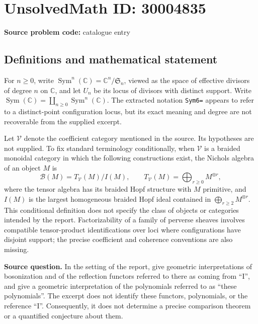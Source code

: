 \documentclass[11pt]{article}
\newcommand{\C}{\mathbb{C}}
\begin{document}
\section*{UnsolvedMath ID: 30004835}
\textbf{Source problem code:} catalogue entry
\subsection{Definitions and mathematical statement}
For \(n\geq 0\), write \(\operatorname{Sym}^{n}(\C)=\C^{n}/\mathfrak S_n\), viewed as the space of effective divisors of degree \(n\) on \(\C\), and let \(U_n\) be its locus of divisors with distinct support. Write \(\operatorname{Sym}(\C)=\coprod_{n\geq0}\operatorname{Sym}^{n}(\C)\). The extracted notation \texttt{Sym6=} appears to refer to a distinct-point configuration locus, but its exact meaning and degree are not recoverable from the supplied excerpt.

Let \(\mathcal V\) denote the coefficient category mentioned in the source. Its hypotheses are not supplied. To fix standard terminology conditionally, when \(\mathcal V\) is a braided monoidal category in which the following constructions exist, the Nichols algebra of an object \(M\) is
\[
\mathcal B(M)=T_{\mathcal V}(M)/I(M),\qquad T_{\mathcal V}(M)=\bigoplus_{r\geq0}M^{\otimes r},
\]
where the tensor algebra has its braided Hopf structure with \(M\) primitive, and \(I(M)\) is the largest homogeneous braided Hopf ideal contained in \(\bigoplus_{r\geq2}M^{\otimes r}\). This conditional definition does not specify the class of objects or categories intended by the report. Factorizability of a family of perverse sheaves involves compatible tensor-product identifications over loci where configurations have disjoint support; the precise coefficient and coherence conventions are also missing.

\textbf{Source question.} In the setting of the report, give geometric interpretations of bosonization and of the reflection functors referred to there as coming from ``I'', and give a geometric interpretation of the polynomials referred to as ``these polynomials''. The excerpt does not identify these functors, polynomials, or the reference ``I''. Consequently, it does not determine a precise comparison theorem or a quantified conjecture about them.
\end{document}
